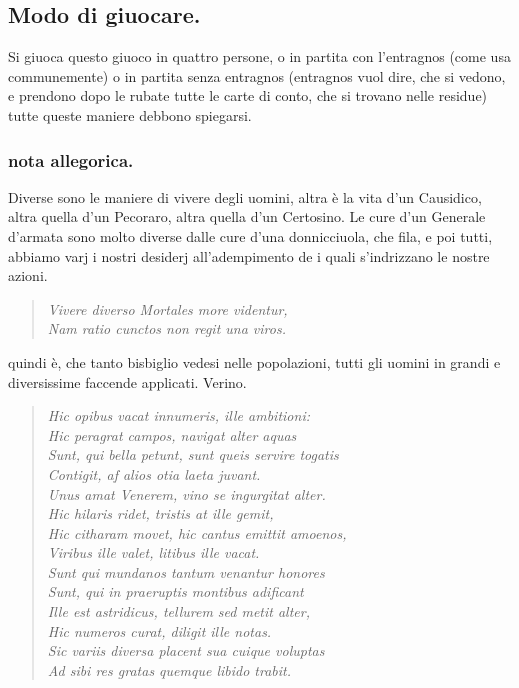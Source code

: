 \documentclass[11pt,a6paper]{article}
\newcommand{\literaryquote}[1]{%
\kern -6pt  \begin{verse}
    {\footnotesize \it #1}
  \end{verse}\kern -2pt%
}
\begin{document}
\subsection{Modo di giuocare.}

Si giuoca questo giuoco in quattro persone,
o in partita con l'entragnos (come
usa communemente) o in partita senza entragnos
(entragnos vuol dire, che si vedono, e
prendono dopo le rubate tutte le carte di
conto, che si trovano nelle residue) tutte
queste maniere debbono spiegarsi.

\subsubsection{nota allegorica.}
{\footnotesize
Diverse sono le maniere di vivere degli uomini,
altra è la vita d'un Causidico, altra quella
d'un Pecoraro, altra quella d'un Certosino. Le
cure d'un Generale d'armata sono molto diverse
dalle cure d'una donnicciuola, che fila, e poi
tutti, abbiamo varj i nostri desiderj
all'adempimento
de i quali s'indrizzano le nostre azioni.
\literaryquote{Vivere diverso Mortales more videntur, \\
Nam ratio cunctos non regit una viros.}

quindi è, che tanto bisbiglio vedesi nelle
popolazioni, tutti gli uomini in grandi e
diversissime faccende applicati. Verino.
\literaryquote{
 Hic opibus vacat innumeris, ille ambitioni: \\
Hic peragrat campos, navigat alter aquas \\
Sunt, qui bella petunt, sunt queis servire togatis\\
Contigit, af alios otia laeta juvant. \\
Unus amat Venerem, vino se ingurgitat alter.\\
Hic hilaris ridet, tristis at ille gemit,\\
Hic citharam movet, hic cantus emittit amoenos,\\
Viribus ille valet, litibus ille vacat. \\
Sunt qui mundanos tantum venantur honores\\
Sunt, qui in praeruptis montibus adificant \\
Ille est astridicus, tellurem sed metit alter, \\
Hic numeros curat, diligit ille notas.\\
Sic variis diversa placent sua cuique voluptas \\
Ad sibi res gratas quemque libido trabit.}

Onde chi si vuole cattivare l'animo di chi che sia,
veda di scoprire il suo desiderio; e quanto più gli si
mostrerà atto a farglielo conseguire, tanto più da
quello sarà frequentato, ed amato: questo è un
precetto di politica sommamente proficuo, che la
maniera di scoprire gli altrui desiderj, inclinazioni,
e pensieri sia il giuoco più abbasso diremo.
}
\end{document}
